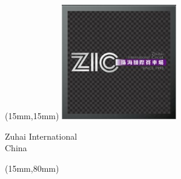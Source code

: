 \begin{textblock*}{50mm}(15mm,15mm)%
\includegraphics[width=50mm]{LG/2015-05-20_00099.png}
\par Zuhai International\\ China
\end{textblock*}
\begin{textblock*}{185mm}(15mm,80mm)%
\end{textblock*}
